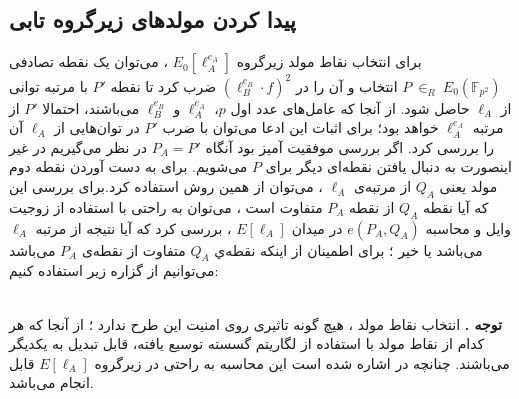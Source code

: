 \subsection{پیدا کردن مولدهای زیرگروه تابی}\label{find_generators_of_torsion_points}

برای انتخاب نقاط مولد زیرگروه
$E_0[\ell_A^{e_A}]$
، می‌توان یک نقطه تصادفی 
$P \:  {\in}_R \: E_0(\mathbb{F}_{p^2}) $
انتخاب و آن را در 
${(\ell_B^{e_B} \cdot f )}^2$
ضرب کرد تا نقطه
$P'$
با مرتبه توانی از 
$\ell_A$
حاصل شود. از آنجا که عامل‌های عدد اول
$p$،
$\ell_A^{e_A}$
و
$\ell_B^{e_B}$
می‌باشند، احتمالا 
$P'$
از مرتبه
$\ell_A^{e_A}$
خواهد بود؛ برای اثبات این ادعا می‌توان با ضرب 
$P'$
در توان‌هایی از 
$\ell_A$
آن را بررسی کرد. اگر بررسی موفقیت آمیز بود آنگاه 
$P_A = P'$
در نظر می‌گیریم در غیر اینصورت به دنبال یافتن نقطه‌ای دیگر برای
$P$
می‌شویم. برای به دست آوردن نقطه دوم مولد یعنی
$Q_A$
از مرتبه‌ی
$\ell_A$
، می‌توان از همین روش استفاده کرد.برای بررسی این که آیا نقطه
$Q_A$
از نقطه
$P_A$
متفاوت است ، می‌توان به راحتی با استفاده از زوجیت وایل و محاسبه
$e(P_A,Q_A)$
در میدان
$E[\ell_A]$
، بررسی کرد که آیا نتیجه از مرتبه 
$\ell_A$
می‌باشد یا خیر ؛ 
برای اطمینان از اینکه نقطه‌ي
$Q_A$
متفاوت از نقطه‌ی 
$P_A$
می‌باشد می‌توانیم از گزاره زیر استفاده کنیم:

\\
\textbf{توجه .}
انتخاب نقاط مولد ، هیچ گونه تاثیری روی امنیت این طرح ندارد ؛ از آنجا که هر کدام از نقاط مولد با استفاده از لگاریتم گسسته توسیع یافته، قابل تبدیل به یکدیگر می‌باشند. چنانچه در 
\cite{teske}
اشاره شده است این محاسبه به راحتی در زیرگروه
$E[\ell_A]$
قابل انجام می‌باشد. 
